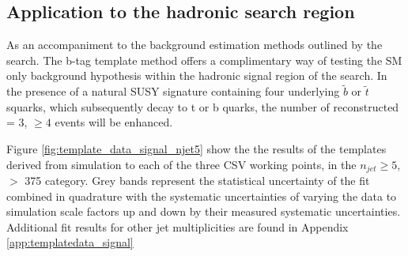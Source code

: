  
\subsection{Application to the \alphat hadronic search region}
\label{subsec:templatedataresults}

As an accompaniment to the background estimation methods outlined by the \alphat search. The b-tag template method offers a complimentary way of testing the \ac{SM} only background hypothesis within the hadronic signal region of the search. In the presence of a natural \ac{SUSY} signature containing four underlying $\widetilde{b}$ or $\widetilde{t}$ squarks, which subsequently decay to t or b quarks, the number of reconstructed \nbreco = 3, $\geq 4$ events will be enhanced.

Figure \ref{fig:template_data_signal_njet5} show the  the results of the templates derived from simulation to each of the three \ac{CSV} working points, in the $n_{jet} \geq 5$, \theht $>$ 375 \GeV category.  Grey bands represent the statistical uncertainty of the fit combined in quadrature with the systematic uncertainties of varying the data to simulation scale factors up and down by their measured systematic uncertainties.  Additional fit results for other jet multiplicities are found in Appendix \ref{app:templatedata_signal}  

